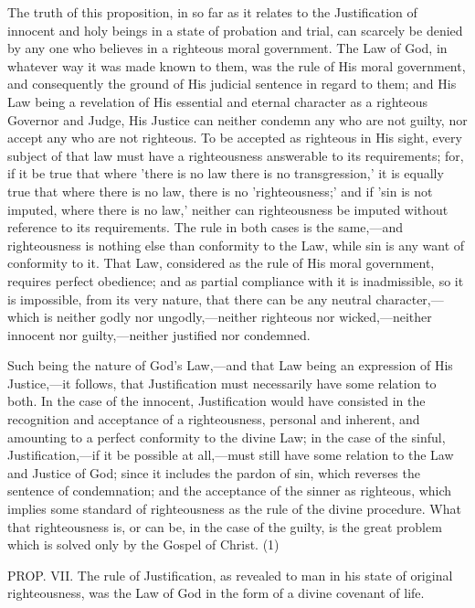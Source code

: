 \documentclass[
]{book}
\begin{document}
The truth of this proposition, in so far as it relates to the Justification of innocent and holy beings in a state of probation and trial, can scarcely be denied by any one who believes in a righteous moral government. The Law of God, in whatever way it was made known to them, was the rule of His moral government, and consequently the ground of His judicial sentence in regard to them; and His Law being a revelation of His essential and eternal character as a righteous Governor and Judge, His Justice can neither condemn any who are not guilty, nor accept any who are not righteous. To be accepted as righteous in His sight, every subject of that law must have a righteousness answerable to its requirements; for, if it be true that where 'there is no law there is no transgression,' it is equally true that where there is no law, there is no 'righteousness;' and if 'sin is not imputed, where there is no law,' neither can righteousness be imputed without reference to its requirements. The rule in both cases is the same,---and righteousness is nothing else than conformity to the Law, while sin is any want of conformity to it. That Law, considered as the rule of His moral government, requires perfect obedience; and as partial compliance with it is inadmissible, so it is impossible, from its very nature, that there can be any neutral character,---which is neither godly nor ungodly,---neither righteous nor wicked,---neither innocent nor guilty,---neither justified nor condemned.

Such being the nature of God's Law,---and that Law being an expression of His Justice,---it follows, that Justification must necessarily have some relation to both. In the case of the innocent, Justification would have consisted in the recognition and acceptance of a righteousness, personal and inherent, and amounting to a perfect conformity to the divine Law; in the case of the sinful, Justification,---if it be possible at all,---must still have some relation to the Law and Justice of God; since it includes the pardon of sin, which reverses the sentence of condemnation; and the acceptance of the sinner as righteous, which implies some standard of righteousness as the rule of the divine procedure. What that righteousness is, or can be, in the case of the guilty, is the great problem which is solved only by the Gospel of Christ. (1)

PROP. VII. The rule of Justification, as revealed to man in his state of original righteousness, was the Law of God in the form of a divine covenant of life.
\end{document}
